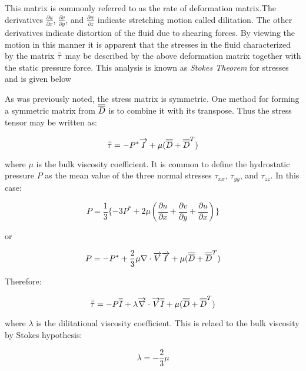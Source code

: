 This matrix is commonly referred to as the rate of deformation matrix.The
derivatives $\frac{\partial{u}}{\partial{x}}$,
$\frac{\partial{v}}{\partial{y}}$, and $\frac{\partial{w}}{\partial{z}}$
indicate stretching motion called dilitation. The other derivatives indicate
distortion of the fluid due to shearing forces. By viewing the motion in this
manner it is apparent that the stresses in the fluid characterized by the
matrix $\bar{\bar{\tau}}$ may be described by the above deformation matrix
together with the static pressure force. This analysis is known as {\it Stokes
Theorem} for stresses and is given below

As was previously noted, the stress matrix is symmetric. One method for forming
a symmetric matrix from $\overline{\overline{D}}$ is to combine it with its transpose. Thus
the stress tensor may be written as:

\begin{equation}
  \bar{\bar{\tau}} = -P^* \overrightarrow{I} + \mu ( \overline{\overline{D}} + \overline{\overline{D}}^T )
\end{equation}

where $\mu$ is the bulk viscosity coefficient. It is common to define the
hydrostatic pressure $P$ as the mean value of the three normal stresses
$\tau_{xx}$, $\tau_{yy}$, and $\tau_{zz}$. In this case:

\begin{equation}
  P = \frac{1}{3} \{ -3P^* + 2\mu(\frac{\partial{u}}{\partial{x}} + \frac{\partial{v}}{\partial{y}} + \frac{\partial{u}}{\partial{x}} ) \}
\end{equation}

or

\begin{equation}
  P = -P^* + \frac{2}{3}\mu \nabla\cdot\overrightarrow{V}\overrightarrow{I} + \mu ( \overline{\overline{D}} + \overline{\overline{D}}^T )
\end{equation}

Therefore:

\begin{equation}
\bar{\bar{\tau}} = -P\overline{\overline{I}} + \lambda\overrightarrow{\nabla}\cdot\overrightarrow{V}\overline{\overline{I}}  + \mu ( \overline{\overline{D}} + \overline{\overline{D}}^T )
\end{equation}

where $\lambda$ is the dilitational viscosity coefficient. This is relaed to
the bulk viscosity by Stokes hypothesis:

\begin{equation}
  \lambda =  - \frac{2}{3}\mu
\end{equation}

